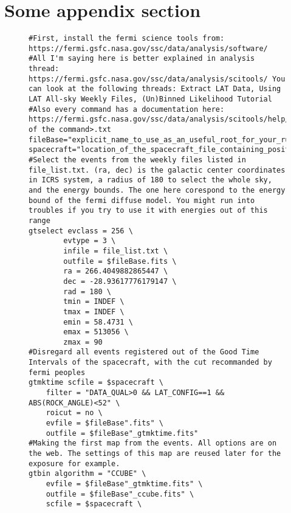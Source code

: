 
\appendix
{}

\section{Some appendix section}
\label{app:fitresults}

\begin{figure}

\begin{lstlisting}
#First, install the fermi science tools from: https://fermi.gsfc.nasa.gov/ssc/data/analysis/software/
#All I'm saying here is better explained in analysis thread: https://fermi.gsfc.nasa.gov/ssc/data/analysis/scitools/ You can look at the following threads: Extract LAT Data, Using LAT All-sky Weekly Files, (Un)Binned Likelihood Tutorial
#Also every command has a documentation here: https://fermi.gsfc.nasa.gov/ssc/data/analysis/scitools/help/<name of the command>.txt
fileBase="explicit_name_to_use_as_an_useful_root_for_your_run"
spacecraft="location_of_the_spacecraft_file_containing_positions_and_infos_about_the_satellite"
#Select the events from the weekly files listed in file_list.txt. (ra, dec) is the galactic center coordinates in ICRS system, a radius of 180 to select the whole sky, and the energy bounds. The one here corespond to the energy bound of the fermi diffuse model. You might run into troubles if you try to use it with energies out of this range
gtselect evclass = 256 \
	    evtype = 3 \
	    infile = file_list.txt \
	    outfile = $fileBase.fits \
	    ra = 266.4049882865447 \
	    dec = -28.93617776179147 \
	    rad = 180 \
	    tmin = INDEF \
	    tmax = INDEF \
	    emin = 58.4731 \
	    emax = 513056 \
	    zmax = 90
#Disregard all events registered out of the Good Time Intervals of the spacecraft, with the cut recommanded by fermi peoples
gtmktime scfile = $spacecraft \
	filter = "DATA_QUAL>0 && LAT_CONFIG==1 && ABS(ROCK_ANGLE)<52" \
	roicut = no \
	evfile = $fileBase".fits" \
	outfile = $fileBase"_gtmktime.fits"
#Making the first map from the events. All options are on the web. The settings of this map are reused later for the exposure for example.
gtbin algorithm = "CCUBE" \
	evfile = $fileBase"_gtmktime.fits" \
	outfile = $fileBase"_ccube.fits" \
	scfile = $spacecraft \

\end{lstlisting}
\end{figure}
